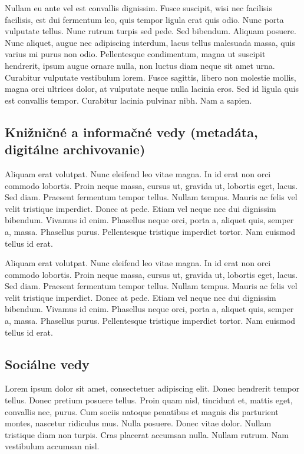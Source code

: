 \documentclass[
  titlepage,
  openright,
  DIV=calc,
  toc=listof,
  listof=nochaptergap]{scrbook}
\begin{document}
Nullam eu ante vel est convallis dignissim. Fusce suscipit, wisi nec
facilisis facilisis, est dui fermentum leo, quis tempor ligula erat quis
odio. Nunc porta vulputate tellus. Nunc rutrum turpis sed pede. Sed
bibendum. Aliquam posuere. Nunc aliquet, augue nec adipiscing interdum,
lacus tellus malesuada massa, quis varius mi purus non odio.
Pellentesque condimentum, magna ut suscipit hendrerit, ipsum augue
ornare nulla, non luctus diam neque sit amet urna. Curabitur vulputate
vestibulum lorem. Fusce sagittis, libero non molestie mollis, magna orci
ultrices dolor, at vulputate neque nulla lacinia eros. Sed id ligula
quis est convallis tempor. Curabitur lacinia pulvinar nibh. Nam a
sapien.

\subsection{Knižničné a informačné vedy (metadáta, digitálne
archivovanie)}\label{kniux17eniux10dnuxe9-a-informaux10dnuxe9-vedy-metaduxe1ta-digituxe1lne-archivovanie}

Aliquam erat volutpat. Nunc eleifend leo vitae magna. In id erat non
orci commodo lobortis. Proin neque massa, cursus ut, gravida ut,
lobortis eget, lacus. Sed diam. Praesent fermentum tempor tellus. Nullam
tempus. Mauris ac felis vel velit tristique imperdiet. Donec at pede.
Etiam vel neque nec dui dignissim bibendum. Vivamus id enim. Phasellus
neque orci, porta a, aliquet quis, semper a, massa. Phasellus purus.
Pellentesque tristique imperdiet tortor. Nam euismod tellus id erat.

Aliquam erat volutpat. Nunc eleifend leo vitae magna. In id erat non
orci commodo lobortis. Proin neque massa, cursus ut, gravida ut,
lobortis eget, lacus. Sed diam. Praesent fermentum tempor tellus. Nullam
tempus. Mauris ac felis vel velit tristique imperdiet. Donec at pede.
Etiam vel neque nec dui dignissim bibendum. Vivamus id enim. Phasellus
neque orci, porta a, aliquet quis, semper a, massa. Phasellus purus.
Pellentesque tristique imperdiet tortor. Nam euismod tellus id erat.

\subsection{Sociálne vedy}\label{sociuxe1lne-vedy}

Lorem ipsum dolor sit amet, consectetuer adipiscing elit. Donec
hendrerit tempor tellus. Donec pretium posuere tellus. Proin quam nisl,
tincidunt et, mattis eget, convallis nec, purus. Cum sociis natoque
penatibus et magnis dis parturient montes, nascetur ridiculus mus. Nulla
posuere. Donec vitae dolor. Nullam tristique diam non turpis. Cras
placerat accumsan nulla. Nullam rutrum. Nam vestibulum accumsan nisl.
\end{document}
